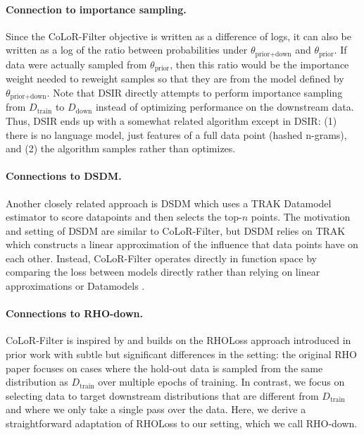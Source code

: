 \documentclass{article}
\newcommand{\Ddown}{D_{\text{down}}}
\newcommand{\Dtrain}{D_{\text{train}}}
\newcommand{\thetaprior}{\theta_{\text{prior}}}
\newcommand{\thetapriordown}{\theta_{\text{prior}+ \text{down}}}
\begin{document}
\paragraph{Connection to importance sampling.} 
Since the CoLoR-Filter objective is written as a difference of logs, it can also be written as a log of the ratio between probabilities under $ \thetapriordown$ and $ \thetaprior$.
If data were actually sampled from $ \thetaprior$, then this ratio would be the importance weight needed to reweight samples so that they are from the model defined by $ \thetapriordown$.
Note that DSIR \citep{xie2023data} directly attempts to perform importance sampling from $ \Dtrain$ to $ \Ddown$ instead of optimizing performance on the downstream data. Thus, DSIR ends up with a somewhat related algorithm except in DSIR: (1) there is no language model, just features of a full data point (hashed n-grams), and (2) the algorithm samples rather than optimizes.

\paragraph{Connections to DSDM.} 
Another closely related approach is DSDM \citep{engstrom2024dsdm} which uses a TRAK Datamodel estimator \citep{ilyas2022datamodels, park2023trak} to score datapoints and then selects the top-$n$ points. The motivation and setting of DSDM are similar to CoLoR-Filter, but DSDM relies on TRAK which constructs a linear approximation of the influence that data points have on each other. Instead, CoLoR-Filter operates directly in function space by comparing the loss between models directly rather than relying on linear approximations or Datamodels \citep{ilyas2022datamodels}.


\paragraph{Connections to RHO-down.} 
CoLoR-Filter is inspired by and builds on the RHOLoss approach introduced in prior work \citep{mindermann2022prioritized} with subtle but significant differences in the setting: the original RHO paper focuses on cases where the hold-out data is sampled from the same distribution as $ \Dtrain$ over multiple epochs of training. In contrast, we focus on selecting data to target downstream distributions that are different from $ \Dtrain$ and where we only take a single pass over the data. Here, we derive a straightforward adaptation of RHOLoss to our setting, which we call RHO-down.
\end{document}

